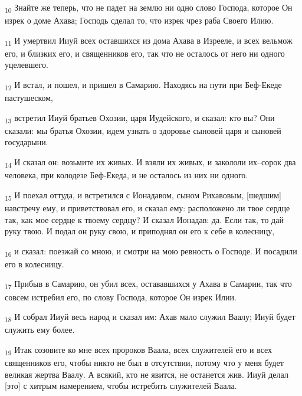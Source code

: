 \begin{tcolorbox}
\textsubscript{10} Знайте же теперь, что не падет на землю ни одно слово Господа, которое Он изрек о доме Ахава; Господь сделал то, что изрек чрез раба Своего Илию.
\end{tcolorbox}
\begin{tcolorbox}
\textsubscript{11} И умертвил Ииуй всех оставшихся из дома Ахава в Изрееле, и всех вельмож его, и близких его, и священников его, так что не осталось от него ни одного уцелевшего.
\end{tcolorbox}
\begin{tcolorbox}
\textsubscript{12} И встал, и пошел, и пришел в Самарию. Находясь на пути при Беф-Екеде пастушеском,
\end{tcolorbox}
\begin{tcolorbox}
\textsubscript{13} встретил Ииуй братьев Охозии, царя Иудейского, и сказал: кто вы? Они сказали: мы братья Охозии, идем узнать о здоровье сыновей царя и сыновей государыни.
\end{tcolorbox}
\begin{tcolorbox}
\textsubscript{14} И сказал он: возьмите их живых. И взяли их живых, и закололи их--сорок два человека, при колодезе Беф-Екеда, и не осталось из них ни одного.
\end{tcolorbox}
\begin{tcolorbox}
\textsubscript{15} И поехал оттуда, и встретился с Ионадавом, сыном Рихавовым, [шедшим] навстречу ему, и приветствовал его, и сказал ему: расположено ли твое сердце так, как мое сердце к твоему сердцу? И сказал Ионадав: да. Если так, то дай руку твою. И подал он руку свою, и приподнял он его к себе в колесницу,
\end{tcolorbox}
\begin{tcolorbox}
\textsubscript{16} и сказал: поезжай со мною, и смотри на мою ревность о Господе. И посадили его в колесницу.
\end{tcolorbox}
\begin{tcolorbox}
\textsubscript{17} Прибыв в Самарию, он убил всех, остававшихся у Ахава в Самарии, так что совсем истребил его, по слову Господа, которое Он изрек Илии.
\end{tcolorbox}
\begin{tcolorbox}
\textsubscript{18} И собрал Ииуй весь народ и сказал им: Ахав мало служил Ваалу; Ииуй будет служить ему более.
\end{tcolorbox}
\begin{tcolorbox}
\textsubscript{19} Итак созовите ко мне всех пророков Ваала, всех служителей его и всех священников его, чтобы никто не был в отсутствии, потому что у меня будет великая жертва Ваалу. А всякий, кто не явится, не останется жив. Ииуй делал [это] с хитрым намерением, чтобы истребить служителей Ваала.
\end{tcolorbox}
